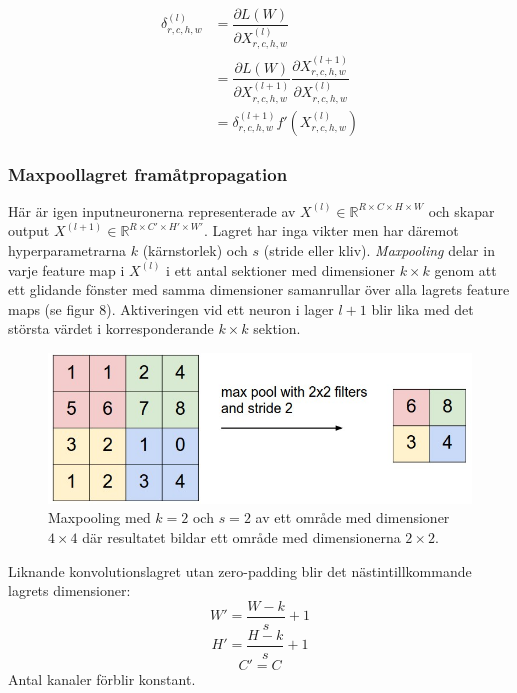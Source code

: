 \documentclass[a4paper,11pt,twoside]{article}
\newcommand*{\pd}[2]{\ensuremath{\dfrac{\partial #1}{\partial #2}}}
\begin{document}
\begin{equation}
\begin{split}
\delta^{(l)}_{r,c,h,w}
		& = \pd{L(W)}{X^{(l)}_{r,c,h,w}} \\
		& = \pd{L(W)}{X^{(l+1)}_{r,c,h,w}} \pd{X^{(l+1)}_{r,c,h,w}}{X^{(l)}_{r,c,h,w}} \\
		& = \delta^{(l+1)}_{r,c,h,w} f'(X^{(l)}_{r,c,h,w})
\end{split}
\end{equation}

\subsubsection{Maxpoollagret framåtpropagation}
Här är igen inputneuronerna representerade av $X^{(l)} \in \mathbb{R}^{R \times C \times H \times W}$ och skapar output $X^{(l+1)} \in \mathbb{R}^{R \times C' \times H' \times W'}$. Lagret har inga vikter men har däremot hyperparametrarna $k$ (kärnstorlek) och $s$ (stride eller kliv). \textit{Maxpooling} delar in varje feature map i $X^{(l)}$ i ett antal sektioner med dimensioner $k \times k$ genom att ett glidande fönster med samma dimensioner samanrullar över alla lagrets feature maps (se figur 8). Aktiveringen vid ett neuron i lager $l+1$ blir lika med det största värdet i korresponderande $k \times k$ sektion. \cite{cs231n} \cite{convmath} \cite{convarithmetic}

\begin{figure}[h]\label{figmaxpool}
	\centering
  		\includegraphics[scale=0.7]{maxpool.png}
  	\caption{Maxpooling med $k=2$ och $s=2$ av ett område med dimensioner $4 \times 4$ där resultatet bildar ett område med dimensionerna $2 \times 2$.}
\end{figure}

Liknande konvolutionslagret utan zero-padding blir det nästintillkommande lagrets dimensioner: \cite{cs231n} \cite{convmath} \cite{convarithmetic}
\begin{equation}
W' = \frac{W-k}{s}+1
\end{equation}
\begin{equation}
H' = \frac{H-k}{s}+1
\end{equation}
\begin{equation}
C' = C
\end{equation}
Antal kanaler förblir konstant.
\end{document}
